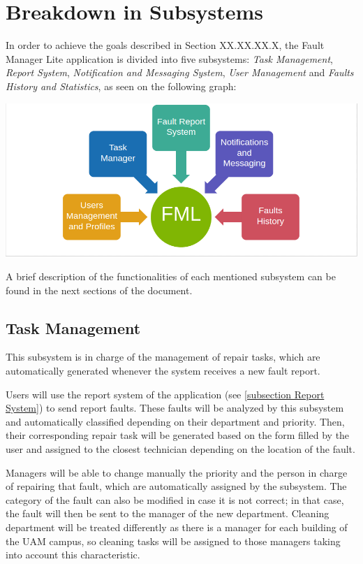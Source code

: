 \section{Breakdown in Subsystems}


In order to achieve the goals described in Section XX.XX.XX.X, the Fault Manager Lite application is divided into five subsystems: \emph{Task Management}, \emph{Report System}, \emph{Notification and Messaging System}, \emph{User Management} and \emph{Faults History and Statistics}, as seen on the following graph:

\includegraphics[scale=0.5]{img/subsystems.png}

A brief description of the functionalities of each mentioned subsystem can be found in the next sections of the document.


\subsection{Task Management}
\label{subsection Task Management}

This subsystem is in charge of the management of repair tasks, which are automatically generated whenever the system receives a new fault report.

Users will use the report system of the application (see \ref{subsection Report System}) to send report faults. These faults will be analyzed by this subsystem and automatically classified depending on their department and priority. Then, their corresponding repair task will be generated based on the form filled by the user and assigned to the closest technician depending on the location of the fault.

Managers will be able to change manually the priority and the person in charge of repairing that fault, which are automatically assigned by the subsystem. The category of the fault can also be modified in case it is not correct; in that case, the fault will then be sent to the manager of the new department. Cleaning department will be treated differently as there is a manager for each building of the UAM campus, so cleaning tasks will be assigned to those managers taking into account this characteristic.

